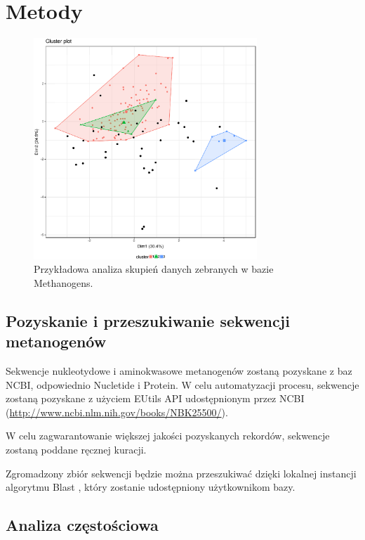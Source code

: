 \documentclass{article}
\begin{document}
\section{Metody}

\begin{figure}[ht]
\centering
\includegraphics[width=0.75\textwidth]{cluster.eps}
\caption{Przykładowa analiza skupień danych zebranych w bazie Methanogens.}
\label{fig:cluster}
\end{figure}

\subsection{Pozyskanie i przeszukiwanie sekwencji metanogenów}

Sekwencje nukleotydowe i aminokwasowe metanogenów zostaną pozyskane z baz NCBI, 
odpowiednio Nucletide i Protein. W celu automatyzacji procesu, sekwencje zostaną 
pozyskane z użyciem EUtils API udostępnionym przez NCBI 
(\url{http://www.ncbi.nlm.nih.gov/books/NBK25500/}).

W celu zagwarantowanie większej jakości pozyskanych rekordów, sekwencje zostaną 
poddane ręcznej kuracji. 

Zgromadzony zbiór sekwencji będzie można przeszukiwać dzięki lokalnej instancji 
algorytmu Blast \citep{altschul_basic_1990}, który zostanie udostępniony 
użytkownikom bazy.

\subsection{Analiza częstościowa}
\end{document}
